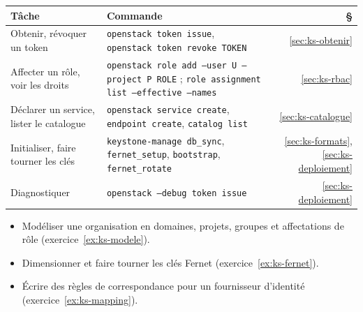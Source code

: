 \begin{center}
\renewcommand{\arraystretch}{1.2}
\begin{tabular}{@{}>{\raggedright\arraybackslash}p{4.4cm}>{\raggedright\arraybackslash}p{9.6cm}r@{}}
\toprule
\textbf{Tâche} & \textbf{Commande} & \textbf{§} \\
\midrule
Obtenir, révoquer un token & \texttt{openstack token issue}, \texttt{openstack token revoke TOKEN} & \ref{sec:ks-obtenir} \\
Affecter un rôle, voir les droits & \texttt{openstack role add --user U --project P ROLE} ; \texttt{role assignment list --effective --names} & \ref{sec:ks-rbac} \\
Déclarer un service, lister le catalogue & \texttt{openstack service create}, \texttt{endpoint create}, \texttt{catalog list} & \ref{sec:ks-catalogue} \\
Initialiser, faire tourner les clés & \texttt{keystone-manage db\_sync}, \texttt{fernet\_setup}, \texttt{bootstrap}, \texttt{fernet\_rotate} & \ref{sec:ks-formats}, \ref{sec:ks-deploiement} \\
Diagnostiquer & \texttt{openstack --debug token issue} & \ref{sec:ks-deploiement} \\
\bottomrule
\end{tabular}
\end{center}

\begin{savoirfaire}
\begin{itemize}
  \item Modéliser une organisation en domaines, projets, groupes et affectations de rôle (exercice~\ref{ex:ks-modele}).
  \item Dimensionner et faire tourner les clés Fernet (exercice~\ref{ex:ks-fernet}).
  \item Écrire des règles de correspondance pour un fournisseur d'identité (exercice~\ref{ex:ks-mapping}).
\end{itemize}
\end{savoirfaire}
